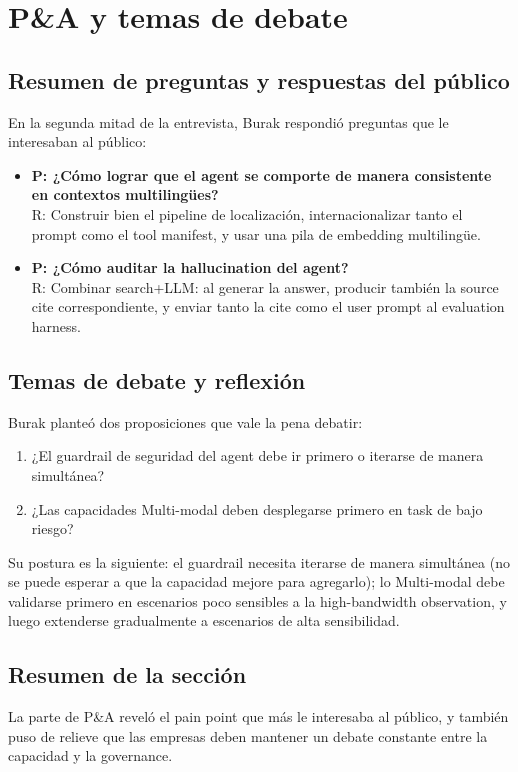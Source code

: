 \section{P\&A y temas de debate}

\subsection{Resumen de preguntas y respuestas del público}

En la segunda mitad de la entrevista, Burak respondió preguntas que le interesaban al público:

\begin{itemize}
    \item \textbf{P: ¿Cómo lograr que el agent se comporte de manera consistente en contextos multilingües?}\\
    R: Construir bien el pipeline de localización, internacionalizar tanto el prompt como el tool manifest, y usar una pila de embedding multilingüe.
    \item \textbf{P: ¿Cómo auditar la hallucination del agent?}\\
    R: Combinar search+LLM: al generar la answer, producir también la source cite correspondiente, y enviar tanto la cite como el user prompt al evaluation harness.
\end{itemize}

\subsection{Temas de debate y reflexión}

Burak planteó dos proposiciones que vale la pena debatir:

\begin{enumerate}
    \item ¿El guardrail de seguridad del agent debe ir primero o iterarse de manera simultánea?
    \item ¿Las capacidades Multi-modal deben desplegarse primero en task de bajo riesgo?
\end{enumerate}

Su postura es la siguiente: el guardrail necesita iterarse de manera simultánea (no se puede esperar a que la capacidad mejore para agregarlo); lo Multi-modal debe validarse primero en escenarios poco sensibles a la high-bandwidth observation, y luego extenderse gradualmente a escenarios de alta sensibilidad.

\subsection{Resumen de la sección}

La parte de P\&A reveló el pain point que más le interesaba al público, y también puso de relieve que las empresas deben mantener un debate constante entre la capacidad y la governance.


